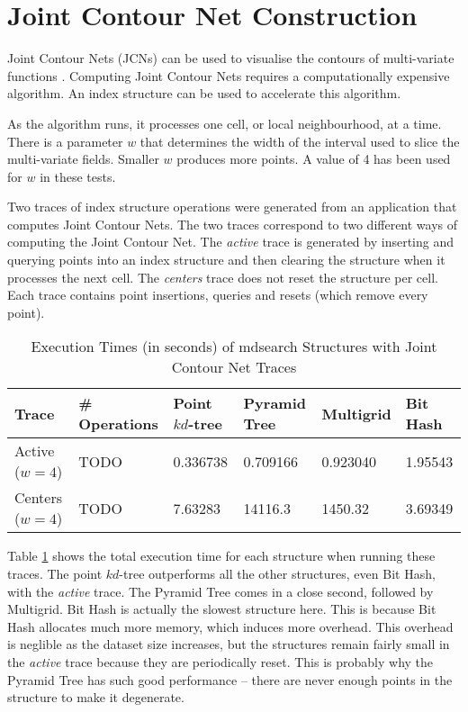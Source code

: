 \section{Joint Contour Net Construction}

Joint Contour Nets (JCNs) can be used to visualise the contours of multi-variate functions \cite{jcn}. Computing Joint Contour Nets requires a computationally expensive algorithm. An index structure can be used to accelerate this algorithm.

As the algorithm runs, it processes one cell, or local neighbourhood, at a time. There is a parameter $w$ that determines the width of the interval used to slice the multi-variate fields. Smaller $w$ produces more points. A value of 4 has been used for $w$ in these tests.

Two traces of index structure operations were generated from an application that computes Joint Contour Nets. The two traces correspond to two different ways of computing the Joint Contour Net. The \textit{active} trace is generated by inserting and querying points into an index structure and then clearing the structure when it processes the next cell. The \textit{centers} trace does not reset the structure per cell. Each trace contains point insertions, queries and resets (which remove every point).

\begin{table}
	\centering
	\begin{tabular}{|l|l|l|l|l|l|}
		\hline
		\textbf{Trace} & \textbf{\# Operations} & Point $kd$-tree & Pyramid Tree & Multigrid & Bit Hash \\
		\hline
		Active ($w = 4$) & TODO & 0.336738 & 0.709166 & 0.923040 & 1.95543 \\
		Centers ($w = 4$) & TODO & 7.63283 & 14116.3 & 1450.32 & 3.69349 \\
		\hline
	\end{tabular}

	\caption{Execution Times (in seconds) of mdsearch Structures with Joint Contour Net Traces}
	\label{tab:jcn-trace-times}
\end{table}

Table \ref{tab:jcn-trace-times} shows the total execution time for each structure when running these traces. The point $kd$-tree outperforms all the other structures, even Bit Hash, with the \textit{active} trace. The Pyramid Tree comes in a close second, followed by Multigrid. Bit Hash is actually the slowest structure here. This is because Bit Hash allocates much more memory, which induces more overhead. This overhead is neglible as the dataset size increases, but the structures remain fairly small in the \textit{active} trace because they are periodically reset. This is probably why the Pyramid Tree has such good performance -- there are never enough points in the structure to make it degenerate.

